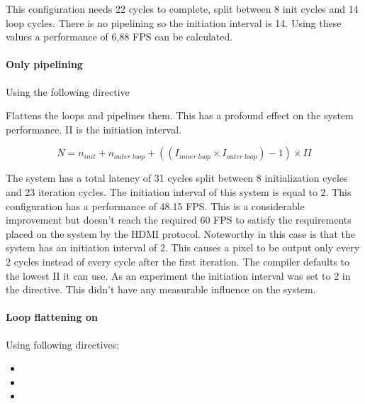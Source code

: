 \bigskip

This configuration needs 22 cycles to complete, split between 8 init cycles and 14 loop cycles. There is no pipelining so the initiation interval is 14. Using these values a performance of 6,88 FPS can be calculated. 

\paragraph{Only pipelining} Using the following directive


Flattens the loops and pipelines them. This has a profound effect on the system performance. II is the initiation interval.


\begin{equation} \label{eq:only_pipelining}
N  = n_{init} + n_{outer\;loop} + ((I_{inner\;loop} \times I_{outer\;loop}) - 1) \times II
\end{equation}

\bigskip

The system has a total latency of 31 cycles split between 8 initialization cycles and 23 iteration cycles. The initiation interval of this system is equal to 2. This configuration has a performance of 48.15 FPS. This is a considerable improvement but doesn't reach the required 60 FPS to satisfy the requirements placed on the system by the HDMI protocol. Noteworthy in this case is that the system has an initiation interval of 2. This causes a pixel to be output only every 2 cycles instead of every cycle after the first iteration. The compiler defaults to the lowest II it can use. As an experiment the initiation interval was set to 2 in the directive. This didn't have any measurable influence on the system.

\paragraph{Loop flattening on}
Using following directives:

\begin{itemize}
\item {}
\item {}
\item {}
\end{itemize}

